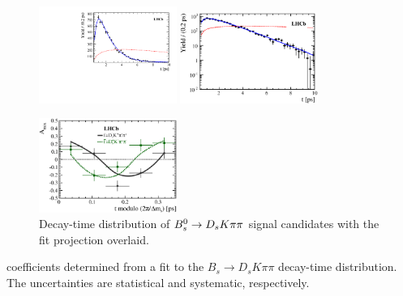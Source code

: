 \begin{figure}[h]
	\centering
		\includegraphics[width=0.4\textwidth, height = !]{figs/timeFit/signal_new2/h_t.pdf} 
		\includegraphics[width=0.4\textwidth, height = !]{figs/timeFit/signal_new2/h_t_log.eps} 

		\includegraphics[width=0.4\textwidth, height = !]{figs/timeFit/signal_new2/h_asym.eps} 		
		\caption{Decay-time distribution of ${{B}^0_{s}}\rightarrow{\ensuremath{{D}_{s}}}{\ensuremath{K}}{\ensuremath{\pi}}{\ensuremath{\pi}}$ signal candidates with the fit projection overlaid.} 
		\label{fig:tFitSig}
\end{figure}	

\begin{table}[h]
\centering
\caption{\CP coefficients determined from a fit to the $B_s \to D_s K \pi\pi$ decay-time distribution. The uncertainties are statistical and systematic, respectively.}
	\renewcommand{\arraystretch}{1.5}
	
\label{tab:sigFitResults}
\end{table}

